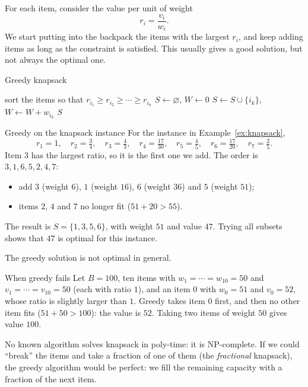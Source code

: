 \documentclass[a4paper,12pt,oneside]{report}
\begin{document}
For each item, consider the value per unit of weight
\[
  r_i=\frac{v_i}{w_i}.
\]
We start putting into the backpack the items with the largest $r_i$,
and keep adding items as long as the constraint is satisfied. This
usually gives a good solution, but not always the optimal one.

\begin{framedalgo}{Greedy knapsack}\label{alg:greedy-knapsack}
\begin{algorithmic}[1]
  \State sort the items so that $r_{i_1}\geq r_{i_2}\geq\cdots\geq r_{i_n}$
  \State $S\gets\varnothing$, $W\gets0$
      \State $S\gets S\cup\{i_k\}$, $W\gets W+w_{i_k}$
    \EndIf
  \EndFor
  \State \Return $S$
\end{algorithmic}
\end{framedalgo}

\begin{framedexample}{Greedy on the knapsack instance}
\label{ex:greedy-knapsack}
For the instance in Example~\ref{ex:knapsack},
\[
  r_1=1,\quad r_2=\tfrac34,\quad r_3=\tfrac43,\quad r_4=\tfrac{17}{30},
  \quad r_5=\tfrac45,\quad r_6=\tfrac{17}{20},\quad r_7=\tfrac25.
\]
Item $3$ has the largest ratio, so it is the first one we add. The
order is $3,1,6,5,2,4,7$:
\begin{itemize}
  \item add $3$ (weight $6$), $1$ (weight $16$), $6$ (weight $36$) and
    $5$ (weight $51$);
  \item items $2$, $4$ and $7$ no longer fit ($51+20>55$).
\end{itemize}
The result is $S=\{1,3,5,6\}$, with weight $51$ and value $47$. Trying
all subsets shows that $47$ is optimal for this instance.
\end{framedexample}

The greedy solution is not optimal in general.

\begin{framedexample}{When greedy fails}\label{ex:greedy-fails}
Let $B=100$, ten items with $w_1=\cdots=w_{10}=50$ and
$v_1=\cdots=v_{10}=50$ (each with ratio $1$), and an item $0$ with
$w_0=51$ and $v_0=52$, whose ratio is slightly larger than $1$.
Greedy takes item $0$ first, and then no other item fits
($51+50>100$): the value is $52$. Taking two items of weight $50$
gives value $100$.
\end{framedexample}

No known algorithm solves knapsack in poly-time: it is NP-complete. If
we could ``break'' the items and take a fraction of one of them (the
\emph{fractional} knapsack), the greedy algorithm would be perfect: we
fill the remaining capacity with a fraction of the next item.
\end{document}
